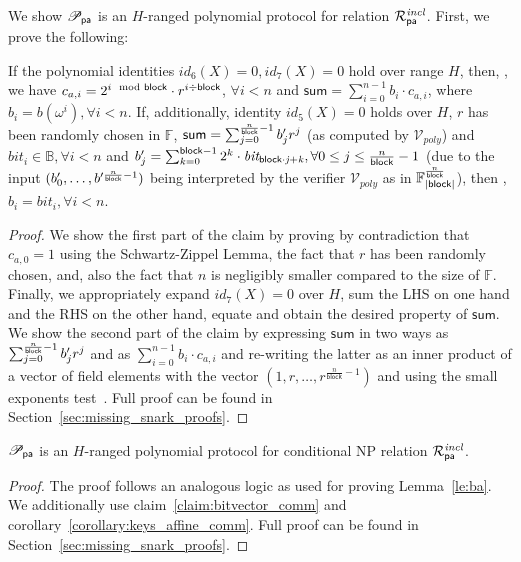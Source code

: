 \noindent We show $\mathscr{P}_{\mathsf{pa}}$ is an $H$-ranged polynomial protocol 
for relation $\mathcal{R}^{\mathit{incl}}_{\mathsf{pa}}$. First, we prove the following:

\begin{test_claim}
\label{claim:bitvector_comm}
If the polynomial identities $id_6(X) = 0, id_7(X) = 0$ hold over range $H$, then, 
\ewnp, 
we have $c_{a,i} =  2^{i \mod {\mathsf{block}}} \cdot r^{i \div \mathsf{block}}$, $\forall i < n$ and $\mathsf{sum} = \sum_{i=0}^{n-1}b_i \cdot c_{a,i}$, 
where $b_i = b(\omega^i), \forall i <n$. If, additionally, identity $id_5(X) = 0$ holds over $H$, 
$r$ has been randomly chosen in $\mathbb{F}$, $\mathsf{sum} = \sum_{j=0}^{\frac{n}{\mathsf{block}}-1} b'_{j}r^j$ 
(as computed by $\mathcal{V}_{poly}$) and $\mathit{bit_{i}} \in \mathbb{B}, \forall i < n$ and 
$b'_{j} = \sum_{k=0}^{\mathsf{block} -1}2^k \cdot \mathit{bit_{\mathsf{block} \cdot j + k}}, \forall 0 \leq j \leq \frac{n}{\mathsf{block}} -1$ 
(due to the input $(b'_{0}, \ldots, b'^{\frac{n}{\mathsf{block}} -1})$ 
being interpreted by the verifier $\mathcal{V}_{poly}$ as in $\mathbb{F}_{|\mathsf{block}|}^{\frac{n}{\mathsf{block}}}$), then \ewnp, 
$b_i = \mathit{bit_{i}}, \forall i <n$.
\end{test_claim}

\begin{proof}
We show the first part of the claim by proving by contradiction that $c_{a,0} =1$ using the Schwartz-Zippel Lemma, the fact that $r$ has been 
randomly chosen, and, also the fact that $n$ is negligibly smaller compared to the size of $\mathbb{F}$. Finally, we appropriately expand $\mathit{id_7}(X) = 0$ 
over $H$, sum the LHS on one hand and the RHS on the other hand, equate and obtain the desired property of $\mathsf{sum}$. We show the second part of 
the claim by expressing $\mathsf{sum}$ in two ways as $\sum_{j=0}^{\frac{n}{\mathsf{block}}-1} b'_{j}r^j $ and as $\sum_{i=0}^{n-1} b_i \cdot c_{a,i}$ and re-writing the 
latter as an inner product of a vector of field elements with the vector $(1, r, \ldots, r^{\frac{n}{\mathsf{block}}-1})$ and using the small exponents test~\cite{small_exponents}. 
Full proof can be found in Section~\ref{sec:missing_snark_proofs}.
\end{proof}

\begin{lemma} 
$\mathscr{P}_{\mathsf{pa}}$ is an $H$-ranged polynomial protocol for conditional NP relation $\mathcal{R}^{\mathit{incl}}_{\mathsf{pa}}$.
\end{lemma}

\begin{proof} 
The proof follows an analogous logic as used for proving Lemma~\ref{le:ba}. We additionally use 
claim~\ref{claim:bitvector_comm} and corollary~\ref{corollary:keys_affine_comm}. Full proof can be found in Section~\ref{sec:missing_snark_proofs}.
\end{proof}

